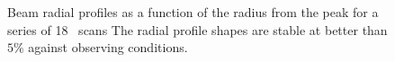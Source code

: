 \begin{figure}[!thbp]
  \caption[Stability of the beam profile]{Beam radial profiles as a
    function of the radius from the peak for a series of 18
    \bm\ scans %
    The radial
    profile shapes are stable at better than $5\%$ 
    against observing conditions.}
  \label{fig:beam_prof}
\end{figure}



%



